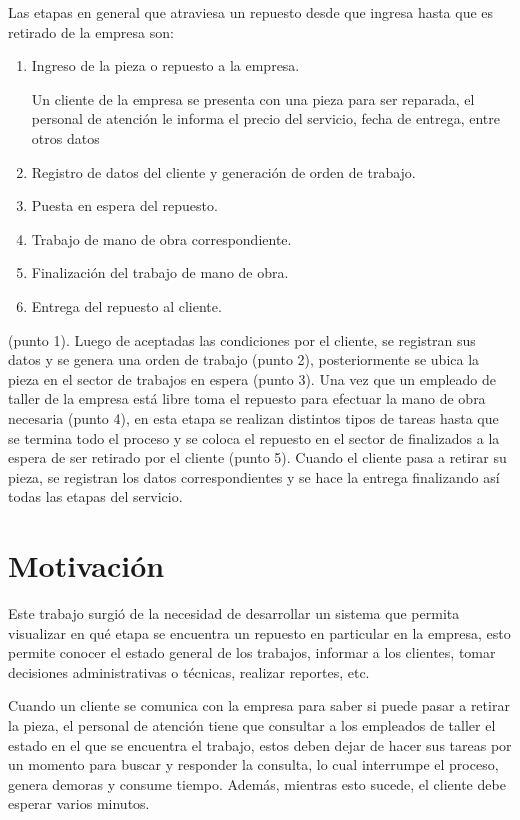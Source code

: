 Las etapas en general que atraviesa un repuesto desde que ingresa hasta que es retirado de la empresa son:
\begin{enumerate}
\item Ingreso de la pieza o repuesto a la empresa. 	

Un cliente de la empresa se presenta con una pieza para ser reparada, el personal de atención le informa el precio del servicio, fecha de entrega, entre otros datos

\item Registro de datos del cliente y generación de orden de trabajo.
\item Puesta en espera del repuesto.
\item Trabajo de mano de obra correspondiente.
\item Finalización del trabajo de mano de obra.
\item Entrega del repuesto al cliente.
\end{enumerate}

 (punto 1). Luego de aceptadas las condiciones por el cliente, se registran sus datos y se genera una orden de trabajo (punto 2), posteriormente se ubica la pieza en el sector de trabajos en espera (punto 3). Una vez que un empleado de taller de la empresa está libre toma el repuesto para efectuar la mano de obra necesaria (punto 4), en esta etapa se realizan distintos tipos de tareas hasta que se termina todo el proceso y se coloca el repuesto en el sector de finalizados a la espera de ser retirado por el cliente (punto 5). Cuando el cliente pasa a retirar su pieza, se registran los datos correspondientes y se hace la entrega finalizando así todas las etapas del servicio.


\section{Motivación}

Este trabajo surgió de la necesidad de desarrollar un sistema que permita visualizar en qué etapa se encuentra un repuesto en particular en la empresa, esto permite conocer el estado general de los trabajos, informar a los clientes, tomar decisiones administrativas o técnicas, realizar reportes, etc. 

Cuando un cliente se comunica con la empresa para saber si puede pasar a retirar la pieza, el personal de atención tiene que consultar a los empleados de taller el estado en el que se encuentra el trabajo, estos deben dejar de hacer sus tareas por un momento para buscar y responder la consulta, lo cual interrumpe el proceso, genera demoras y consume tiempo. Además, mientras esto sucede, el cliente debe esperar varios minutos. 

